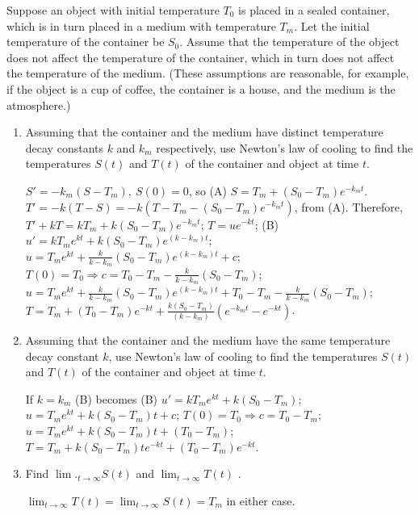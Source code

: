 \documentclass{ximera}
\begin{document}
\begin{problem}\label{exer:4.2.16}
Suppose an object  with initial temperature $T_0$
is placed in a sealed container, which is in turn placed in a medium with
temperature $T_m$. Let the initial
temperature of the container be $S_0$. Assume that the temperature of the
object does not affect the temperature of the container, which in turn does
not affect the temperature of the medium. (These assumptions  are
reasonable, for example, if the object is a cup of coffee, the container is
a house, and the medium is the atmosphere.)

\begin{enumerate}
\item %
Assuming that the container and the medium have distinct temperature
decay constants $k$ and $k_m$ respectively, use Newton's law of
cooling to find the temperatures $S(t)$ and $T(t)$ of the container
and object at time $t$.

\begin{solution}
$S'=-k_m(S-T_m),\ S(0)=0$, so (A)
$S=T_m+(S_0-T_m)e^{-k_mt}$.
$T'=-k(T-S)=-k\left(T-T_m-(S_0-T_m)e^{-k_mt}\right)$,
from
(A). Therefore,$T'+kT=kT_m+k(S_0-T_m)e^{-k_mt}$; $T=ue^{-kt}$;
(B) $u'=kT_me^{kt}+k(S_0-T_m)e^{(k-k_m)t}$;
 $u=T_me^{kt}+\frac{k}{k-k_m}(S_0-T_m)e^{(k-k_m)t}+c$;
 $T(0)=T_0\Rightarrow
 c=T_0-T_m-\frac{k}{k-k_m}(S_0-T_m)$;
 $u=T_me^{kt}+\frac{k}{k-k_m}(S_0-T_m)e^{(k-k_m)t}+T_0-T_m-\frac{k}{k-k_m}(S_0-T_m)$;
$T=T_m+(T_0-T_m)e^{-kt}+\frac{k(S_0-T_m)}{(k-k_m)}\left(e^{-k_mt}-e^{-kt}\right)$.
\end{solution}

\item %
Assuming that the container and the medium have the same temperature
decay constant $k$, use Newton's law of cooling to find the
temperatures $S(t)$ and $T(t)$ of the container and object at time
$t$.

\begin{solution}
If $k=k_m$ (B) becomes
(B) $u'=kT_me^{kt}+k(S_0-T_m)$; $u=T_me^{kt}+k(S_0-T_m)t+c$;
$T(0)=T_0\Rightarrow c=T_0-T_m$;
$u=T_me^{kt}+k(S_0-T_m)t+(T_0-T_m)$;
$T=T_m+k(S_0-T_m)te^{-kt}+(T_0-T_m)e^{-kt}$.
\end{solution}

\item %
Find $\lim._{t\to\infty}S(t)$  and $\lim_{t\to\infty}T(t)$ .

\begin{solution}
$\lim_{t\to\infty}T(t)=\lim_{t\to\infty}S(t)=T_m$
in either case.
\end{solution}
\end{enumerate}
\end{problem}
\end{document}
